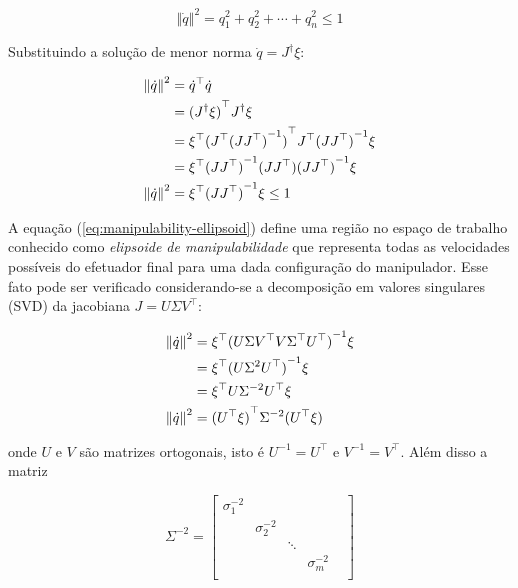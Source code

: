 \begin{equation}
    \left\Vert \dot{q} \right\Vert^2 = q_1^2 + q_2^2 + \cdots + q_n^2 \leq 1
\end{equation}

Substituindo a solução de menor norma \(\dot{q} = J^\dag \xi\):

\begin{align}\label{eq:manipulability-ellipsoid}
    \left\Vert \dot{q} \right\Vert^2 & = \dot{q}^\top \dot{q} \notag                                                    \\
                                     & = {(J^\dag \xi)}^\top J^\dag \xi \notag                                          \\
                                     & = \xi^\top {(J^\top {(J J^\top)}^{-1})}^\top J^\top {(J J^\top)}^{-1} \xi \notag \\
                                     & = \xi^\top {(J J^\top)}^{-1} (J J^\top) {(J J^\top)}^{-1} \xi \notag             \\
    \left\Vert \dot{q} \right\Vert^2 & = \xi^\top {(J J^\top)}^{-1} \xi \leq 1
\end{align}

A equação (\ref{eq:manipulability-ellipsoid}) define uma região no espaço de
trabalho conhecido como \emph{elipsoide de manipulabilidade} que representa
todas as velocidades possíveis do efetuador final para uma dada configuração do
manipulador. Esse fato pode ser verificado considerando-se a
decomposição em valores singulares (SVD) da jacobiana \(J = U \Sigma V^\top\):

\begin{align}\label{eq:manipulability-ellipsoid-svd}
    \left\Vert \dot{q} \right\Vert^2 & = \xi^\top {(U \Sigma V^\top V \Sigma^\top U^\top)}^{-1} \xi \notag \\
                                     & = \xi^\top {(U \Sigma^2 U^\top)}^{-1} \xi \notag                    \\
                                     & = \xi^\top U \Sigma^{-2} U^\top \xi \notag                          \\
    \left\Vert \dot{q} \right\Vert^2 & = {(U^\top \xi)}^\top \Sigma^{-2} (U^\top \xi)
\end{align}

onde \(U\) e \(V\) são matrizes ortogonais, isto é \(U^{-1} =
U^\top\) e \(V^{-1} = V^\top\). Além disso a matriz

\begin{equation}
    \Sigma^{-2} = \begin{bmatrix}
        \sigma_1^{-2} &               &        &               & \\
                      & \sigma_2^{-2} &        &               & \\
                      &               & \ddots &               & \\
                      &               &        & \sigma_m^{-2} & \\
    \end{bmatrix}
\end{equation}

